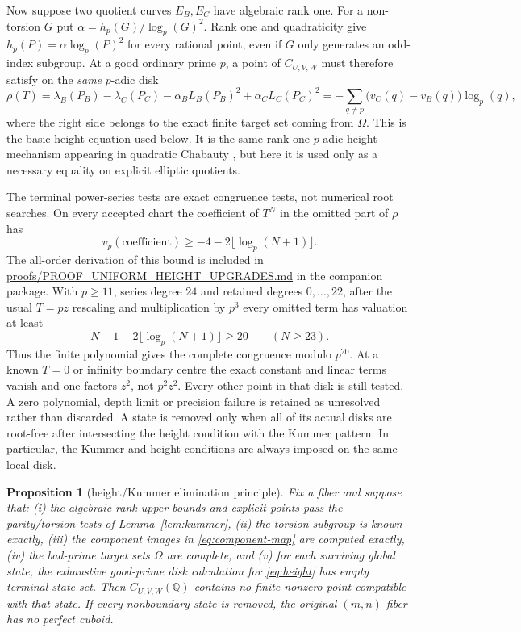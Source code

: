 \documentclass[11pt,a4paper]{amsart}
\newtheorem{proposition}[theorem]{Proposition}
\newcommand{\Q}{\mathbb Q}
\begin{document}
Now suppose two quotient curves $E_B,E_C$ have algebraic rank one. For a non-torsion $G$ put $\alpha=h_p(G)/\log_p(G)^2$. Rank one and quadraticity give $h_p(P)=\alpha\log_p(P)^2$ for every rational point, even if $G$ only generates an odd-index subgroup. At a good ordinary prime $p$, a point of $C_{U,V,W}$ must therefore satisfy on the \emph{same} $p$-adic disk
\begin{equation}\label{eq:height}
\rho(T)=\lambda_B(P_B)-\lambda_C(P_C)-\alpha_B L_B(P_B)^2+\alpha_C L_C(P_C)^2
 =-\sum_{q\ne p}\bigl(v_C(q)-v_B(q)\bigr)\log_p(q),
\end{equation}
where the right side belongs to the exact finite target set coming from $\Omega$. This is the basic height equation used below. It is the same rank-one $p$-adic height mechanism appearing in quadratic Chabauty \cite{Bianchi}, but here it is used only as a necessary equality on explicit elliptic quotients.

The terminal power-series tests are exact congruence tests, not numerical root searches. On every accepted chart the coefficient of $T^N$ in the omitted part of $\rho$ has
\[
v_p(\text{coefficient})\ge -4-2\lfloor\log_p(N+1)\rfloor.
\]
The all-order derivation of this bound is included in \url{proofs/PROOF_UNIFORM_HEIGHT_UPGRADES.md} in the companion package. With $p\ge11$, series degree $24$ and retained degrees $0,\ldots,22$, after the usual $T=pz$ rescaling and multiplication by $p^3$ every omitted term has valuation at least
\[
N-1-2\lfloor\log_p(N+1)\rfloor\ge20\qquad(N\ge23).
\]
Thus the finite polynomial gives the complete congruence modulo $p^{20}$. At a known $T=0$ or infinity boundary centre the exact constant and linear terms vanish and one factors \emph{$z^2$}, not $p^2z^2$. Every other point in that disk is still tested. A zero polynomial, depth limit or precision failure is retained as unresolved rather than discarded. A state is removed only when all of its actual disks are root-free after intersecting the height condition with the Kummer pattern. In particular, the Kummer and height conditions are always imposed on the same local disk.

\begin{proposition}[height/Kummer elimination principle]\label{prop:height}
Fix a fiber and suppose that: (i) the algebraic rank upper bounds and explicit points pass the parity/torsion tests of Lemma~\ref{lem:kummer}, (ii) the torsion subgroup is known exactly, (iii) the component images in \eqref{eq:component-map} are computed exactly, (iv) the bad-prime target sets $\Omega$ are complete, and (v) for each surviving global state, the exhaustive good-prime disk calculation for \eqref{eq:height} has empty terminal state set. Then $C_{U,V,W}(\Q)$ contains no finite nonzero point compatible with that state. If every nonboundary state is removed, the original $(m,n)$ fiber has no perfect cuboid.
\end{proposition}
\end{document}
